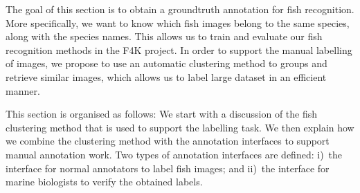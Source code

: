 

The goal of this section is to obtain a groundtruth annotation for fish recognition. 
More specifically, we want to know which fish images belong to the same species, along with
the species names. 
This allows us to train and evaluate our fish recognition methods in the F4K project. 
In order to support the manual labelling of images, we propose to use an automatic clustering method to 
groups and retrieve similar images, which allows us to label large dataset in an efficient manner. 

This section is organised as follows: 
We start with a discussion of the fish clustering method that is used to support the labelling task.
We then explain how we combine the clustering method with the annotation interfaces to support manual annotation work.
Two types of annotation interfaces are defined: i)~the interface for normal annotators to label fish images; 
and ii)~the interface for marine biologists to verify the obtained labels.





